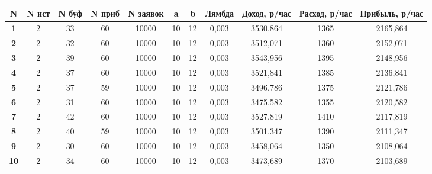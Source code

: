 \documentclass[a4paper, 14pt]{article}
\begin{document}
\small
\begin{center}
	\begin{tabular}{|c|c|c|c|c|c|c|c|c|c|c|}
		\hline
		\textbf{N}  & \textbf{N ист} & \textbf{N буф} & \textbf{N приб} & \textbf{N заявок} & \textbf{a} & \textbf{b} & \textbf{Лямбда} & \textbf{Доход, р/час} & \textbf{Расход, р/час} & \textbf{Прибыль, р/час} \\ \hline
		\textbf{1}  & 2              & 33             & 60              & 10000             & 10         & 12         & 0,003           & 3530,864              & 1365                   & 2165,864                \\ \hline
		\textbf{2}  & 2              & 32             & 60              & 10000             & 10         & 12         & 0,003           & 3512,071              & 1360                   & 2152,071                \\ \hline
		\textbf{3}  & 2              & 39             & 60              & 10000             & 10         & 12         & 0,003           & 3543,956              & 1395                   & 2148,956                \\ \hline
		\textbf{4}  & 2              & 37             & 60              & 10000             & 10         & 12         & 0,003           & 3521,841              & 1385                   & 2136,841                \\ \hline
		\textbf{5}  & 2              & 37             & 59              & 10000             & 10         & 12         & 0,003           & 3496,786              & 1375                   & 2121,786                \\ \hline
		\textbf{6}  & 2              & 31             & 60              & 10000             & 10         & 12         & 0,003           & 3475,582              & 1355                   & 2120,582                \\ \hline
		\textbf{7}  & 2              & 42             & 60              & 10000             & 10         & 12         & 0,003           & 3527,819              & 1410                   & 2117,819                \\ \hline
		\textbf{8}  & 2              & 40             & 59              & 10000             & 10         & 12         & 0,003           & 3501,347              & 1390                   & 2111,347                \\ \hline
		\textbf{9}  & 2              & 30             & 60              & 10000             & 10         & 12         & 0,003           & 3458,064              & 1350                   & 2108,064                \\ \hline
		\textbf{10} & 2              & 34             & 60              & 10000             & 10         & 12         & 0,003           & 3473,689              & 1370                   & 2103,689                \\ \hline
	\end{tabular}
\end{center}
\large
\end{document}

